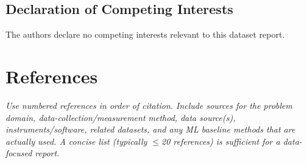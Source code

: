 \documentclass[11pt,a4paper]{article}
\begin{document}
\subsection{Declaration of Competing Interests}

The authors declare no competing interests relevant to this dataset report.

\section{References}

\emph{\small Use numbered references in order of citation. Include sources for the problem domain,
data-collection/measurement method, data source(s), instruments/software, related datasets, and
any ML baseline methods that are actually used. A concise list (typically $\le$20 references) is
sufficient for a data-focused report.}
\end{document}
